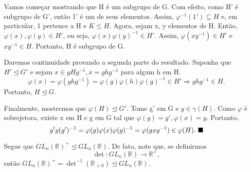 \documentclass[Algebra/algebra_notes.tex]{subfiles}
\begin{document}
\begin{proof*}
	Vamos começar mostrando que H é um subgrupo de G. Com efeito, como H' é subgrupo de G', então 1' é um de seus elementos.
	Assim, $\varphi^{-1}(1')\subseteq{H}$ e, em particular, 1 pertence a H e $K\leq{H}.$ Agora, sejam x, y elementos de H. Então,
	$\varphi(x), \varphi(y)\in H'$, ou seja, $\varphi(x)\varphi(y)^{-1}\in H'$. Assim, $\varphi(xy^{-1})\in H'$ e $xy^{-1}\in H.$
	Portanto, H é subgrupo de G.

	Daremos continuidade provando a segunda parte do resultado. Suponha que $H'\trianglelefteq{G'}$ e sejam $x\in gHg^{-1}, x = ghg^{-1}$
	para algum h em H.
	$$
		\varphi(x) = \varphi(ghg^{-1}) = \varphi(g)\varphi(h)\varphi(g)^{-1}\in H' \Rightarrow ghg^{-1}\in H.
	$$
	Portanto, $H\trianglelefteq{G}.$

	Finalmente, mostremos que $\varphi(H)\trianglelefteq{G'}.$ Tome g' em G e $y\in\gamma(H).$ Como $\varphi$ é sobrejetora, existe
	x em H e g em G tal que $\varphi(g)=g', \varphi(x) = y.$ Portanto,
	$$
		g'y(g')^{-1} = \varphi(g)\varphi(x)\varphi(g)^{-1} = \varphi(gxg^{-1})\in \varphi(H).\text{ $\blacksquare$}
	$$
\end{proof*}
\begin{example*}
	Segue que $GL_{n}(\mathbb{R})^{+}\trianglelefteq{GL_{n}(\mathbb{R})}$. De fato, note que, se definirmos
	$$
		\det:GL_{n}(\mathbb{R})\rightarrow \mathbb{R}^{\times},
	$$
	então $GL_{n}(\mathbb{R})^{+} = \det^{-1}(\mathbb{R}_{>0})\trianglelefteq{GL_{n}(\mathbb{R})}$. \qedsymbol
\end{example*}
\end{document}

